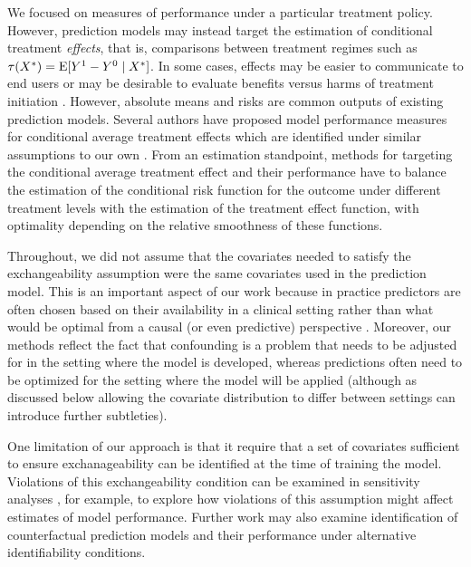 We focused on measures of performance under a particular treatment policy. However, prediction models may instead target the estimation of conditional treatment \textit{effects}, that is, comparisons between treatment regimes such as $\tau(X^*) = \operatorname{E}[Y^1 - Y^0 \mid X^*]$. In some cases, effects may be easier to communicate to end users or may be desirable to evaluate benefits versus harms of treatment initiation \cite{kent_predictive_2020}. However, absolute means and risks are common outputs of existing prediction models. Several authors have proposed model performance measures for conditional average treatment effects which are identified under similar assumptions to our own \cite{schuler_comparison_2018, rolling2014model, xu_calibration_2022, van2003unified, alaa_validating_2019}. From an estimation standpoint, methods for targeting the conditional average treatment effect and their performance have to balance the estimation of the conditional risk function for the outcome under different treatment levels with the estimation of the treatment effect function, with optimality depending on the relative smoothness of these functions.

Throughout, we did not assume that the covariates needed to satisfy the exchangeability assumption were the same covariates used in the prediction model. This is an important aspect of our work because in practice predictors are often chosen based on their availability in a clinical setting rather than what would be optimal from a causal (or even predictive) perspective \cite{steyerberg_clinical_2019}. Moreover, our methods reflect the fact that confounding is a problem that needs to be adjusted for in the setting where the model is developed, whereas predictions often need to be optimized for the setting where the model will be applied (although as discussed below allowing the covariate distribution to differ between settings can introduce further subtleties).

One limitation of our approach is that it require that a set of covariates sufficient to ensure exchanageability can be identified at the time of training the model. Violations of this exchangeability condition can be examined in sensitivity analyses \cite{robins_sensitivity_2000,steingrimsson_sensitivity_2023}, for example, to explore how violations of this assumption might affect estimates of model performance. Further work may also examine identification of counterfactual prediction models and their performance under alternative identifiability conditions.

